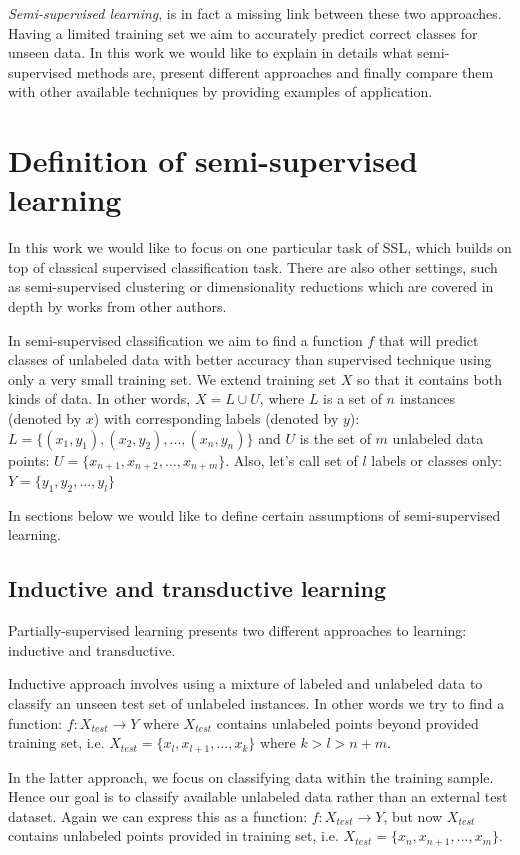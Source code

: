 \documentclass[12pt, a4paper, pdflatex]{report}
\begin{document}
\textit{Semi-supervised learning}, is in fact a missing link between these two approaches. Having a limited training set we aim to accurately predict correct classes for unseen data. In this work we would like to explain in details what semi-supervised methods are, present different approaches and finally compare them with other available techniques by providing examples of application.

\section{Definition of semi-supervised learning}
In this work we would like to focus on one particular task of SSL, which builds on top of classical supervised classification task. There are also other settings, such as semi-supervised clustering or dimensionality reductions which are covered in depth by works from other authors.

In semi-supervised classification we aim to find a function $ f $ that will predict classes of unlabeled data with better accuracy than supervised technique using only a very small training set. We extend training set $ X $ so that it contains both kinds of data. In other words, $ X = L \cup U $, where $ L $ is a set of $ n $ instances (denoted by $ x $) with corresponding labels (denoted by $ y $): $ L = \{ (x_1, y_1), (x_2, y_2), ..., (x_n, y_n)\} $ and $ U $ is the set of $ m $ unlabeled data points: $ U = \{ x_{n+1}, x_{n+2}, ..., x_{n+m}\} $. Also, let's call set of $l$ labels or classes only: $ Y = \{ y_1, y_2, ..., y_l \} $

In sections below we would like to define certain assumptions of semi-supervised learning.

\subsection{Inductive and transductive learning}
Partially-supervised learning presents two different approaches to learning: inductive and transductive\cite{chapelle06}. 

Inductive approach involves using a mixture of labeled and unlabeled data to classify an unseen test set of unlabeled instances. In other words we try to find a function: $ f: X_{test} \to Y $ where $ X_{test} $ contains unlabeled points beyond provided training set, i.e. $ X_{test} = \{ x_l, x_{l+1}, ..., x_{k} \} $ where $ k > l > n+m $.

In the latter approach, we focus on classifying data within the training sample. Hence our goal is to classify available unlabeled data rather than an external test dataset. Again we can express this as a function: $ f: X_{test} \to Y $, but now $ X_{test} $ contains unlabeled points provided in training set, i.e. $ X_{test} = \{ x_n, x_{n+1}, ..., x_{m} \} $.
\end{document}

